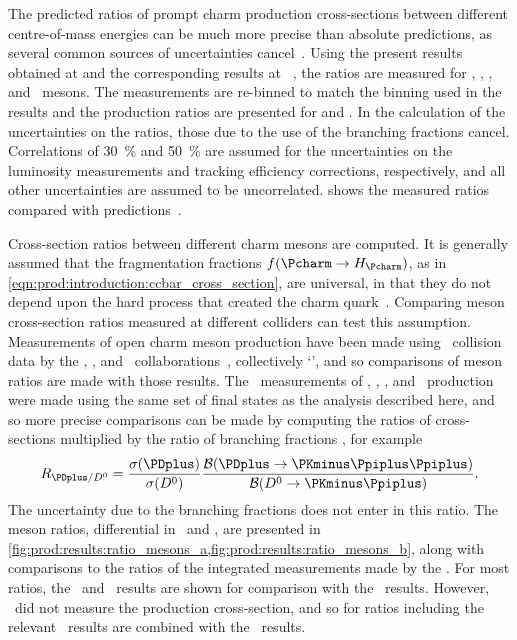 The predicted ratios of prompt charm production cross-sections between
different centre-of-mass energies can be much more precise than absolute
predictions, as several common sources of uncertainties
cancel~\cite{Gauld:2015yia,Cacciari:2015fta,Kniehl:2012ti}.
Using the present results obtained at  and the corresponding
results at ~\cite{LHCb-PAPER-2012-041}, the ratios
 are measured for \PDzero, \PDplus, \PDsplus, and \PDstarp\
mesons.
The  measurements are re-binned to match the binning used in the
\sqrtseq{7} results and the production ratios are presented for 
and \yrange{2}{4.5}.
In the calculation of the uncertainties on the ratios, those due to the use of
the branching fractions cancel.
Correlations of \SI{30}{\percent} and \SI{50}{\percent} are assumed for the
uncertainties on the luminosity measurements and tracking efficiency
corrections, respectively, and all other uncertainties are assumed to be
uncorrelated.
 shows the measured ratios compared with
predictions~\cite{Gauld:2015yia,Cacciari:2015fta,Kniehl:2012ti}.

Cross-section ratios between different charm mesons are computed.
It is generally assumed that the fragmentation fractions $f(\cToHc)$, as in
\cref{eqn:prod:introduction:ccbar_cross_section}, are universal, in that they
do not depend upon the hard process that created the charm
quark~\cite{PDG2008,Lisovyi:2015uqa}.
Comparing meson cross-section ratios measured at different colliders can test
this assumption.
Measurements of open charm meson production have been made using \epem\
collision data by the \babar, \belle, and \cleo\
collaborations~\cite{Artuso:2004pj,Seuster:2005tr,Aubert:2002ue}, collectively
`\bfactories', and so comparisons of meson ratios are made with those results.
The \bfactory\ measurements of \PDzero, \PDplus, \PDsplus, and \PDstarp\
production were made using the same set of final states as the analysis
described here, and so more precise comparisons can be made by computing the
ratios of cross-sections multiplied by the ratio of branching fractions
\xsectimesbfrac, for example
\begin{equation*}
  \resultratio{\PDplus}{\PDzero} = \frac{%
    \xsec(\PDplus)
  }{%
    \xsec(\PDzero)
  }\frac{%
    \bfrac(\DpToKpipi)
  }{%
    \bfrac(\DzToKpi)
  }.
\end{equation*}
The uncertainty due to the branching fractions does not enter in this ratio.
The meson ratios, differential in \pT\ and \rapidity, are presented in
\cref{fig:prod:results:ratio_mesons_a,fig:prod:results:ratio_mesons_b}, along
with comparisons to the ratios of the integrated measurements made by the
\bfactories.
For most ratios, the \belle\ and \cleo\ results are shown for comparison with
the \lhcb\ results.
However, \cleo\ did not measure the \PDsplus production cross-section, and so
for ratios including \PDsplus the relevant \cleo\ results are combined with the
\babar\ \PDsplus results.


